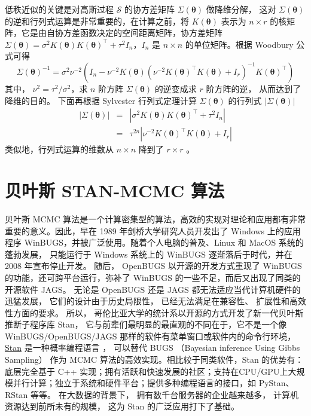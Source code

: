 \documentclass[12pt,a4paper,UTF8,twoside]{book}
\theoremstyle{definition}
\theoremstyle{definition}
\theoremstyle{definition}
\theoremstyle{remark}
\begin{document}
低秩近似的关键是对高斯过程 \(\mathcal{S}\) 的协方差矩阵
\(\Sigma(\boldsymbol{\theta})\) 做降维分解， 这对
\(\Sigma(\boldsymbol{\theta})\)
的逆和行列式运算是非常重要的，在计算之前，将 \(K(\boldsymbol{\theta})\)
表示为 \(n\times r\)
的核矩阵，它是由自协方差函数决定的空间距离矩阵，协方差矩阵
\(\Sigma(\boldsymbol{\theta}) = \sigma^2K(\boldsymbol{\theta})K(\boldsymbol{\theta})^{\top}+\tau^2 I_{n}\)，\(I_{n}\)
是 \(n\times n\) 的单位矩阵。根据 Woodbury 公式可得
\[\Sigma(\boldsymbol{\theta})^{-1} = \sigma^2\nu^{-2}(I_{n}-\nu^{-2}K(\boldsymbol{\theta})(\nu^{-2}K(\boldsymbol{\theta})^{\top} K(\boldsymbol{\theta})+I_{r})^{-1}K(\boldsymbol{\theta})^{\top})\]
其中， \(\nu^2 = \tau^2/\sigma^2\)，求 \(n\) 阶方阵
\(\Sigma(\boldsymbol{\theta})\) 的逆变成求 \(r\) 阶方阵的逆，
从而达到了降维的目的。 下面再根据 Sylvester 行列式定理计算
\(\Sigma(\boldsymbol{\theta})\) 的行列式
\(|\Sigma(\boldsymbol{\theta})|\) \begin{eqnarray*}
|\Sigma(\boldsymbol{\theta})| & = & |\sigma^2K(\boldsymbol{\theta})K(\boldsymbol{\theta})^{\top}+\tau^2 I_{n}| \\ 
                 & = & \tau^{2n}|\nu^{-2}K(\boldsymbol{\theta})^{\top} K(\boldsymbol{\theta})+I_{r}|
\end{eqnarray*} \noindent 类似地，行列式运算的维数从 \(n\times n\)
降到了 \(r\times r\) \citep{Diggle2007}。

\hypertarget{sec:STAN-MCMC}{%
\section{贝叶斯 STAN-MCMC 算法}\label{sec:STAN-MCMC}}

贝叶斯 MCMC
算法是一个计算密集型的算法，高效的实现对理论和应用都有非常重要的意义。因此，早在
1989 年剑桥大学研究人员开发出了 Windows 上的应用程序
WinBUGS，并被广泛使用。随着个人电脑的普及、Linux 和 MacOS
系统的蓬勃发展， 只能运行于 Windows 系统上的 WinBUGS
逐渐落后于时代，并在 2008 年宣布停止开发。 随后， OpenBUGS
以开源的开发方式重现了 WinBUGS 的功能，还可跨平台运行，弥补了 WinBUGS
的一些不足，而后又出现了同类的开源软件 JAGS。 无论是 OpenBUGS 还是 JAGS
都无法适应当代计算机硬件的迅猛发展， 它们的设计由于历史局限性，
已经无法满足在兼容性、 扩展性和高效性方面的要求。 所以，
哥伦比亚大学的统计系以开源的方式开发了新一代贝叶斯推断子程序库 Stan，
它与前辈们最明显的最直观的不同在于，它不是一个像 WinBUGS/OpenBUGS/JAGS
那样的软件有菜单窗口或软件内的命令行环境，
\href{http://mc-stan.org/}{Stan} 是一种概率编程语言
\citep{Stan2017JSS}， 可以替代 BUGS （Bayesian inference Using Gibbs
Sampling） \citep{BUGS2009} 作为 MCMC
算法的高效实现。相比较于同类软件，Stan 的优势有：底层完全基于 C++
实现；拥有活跃和快速发展的社区；支持在CPU/GPU上大规模并行计算；独立于系统和硬件平台；提供多种编程语言的接口，如
PyStan、 RStan 等等。 在大数据的背景下，
拥有数千台服务器的企业越来越多， 计算机资源达到前所未有的规模， 这为
Stan 的广泛应用打下了基础。
\end{document}
